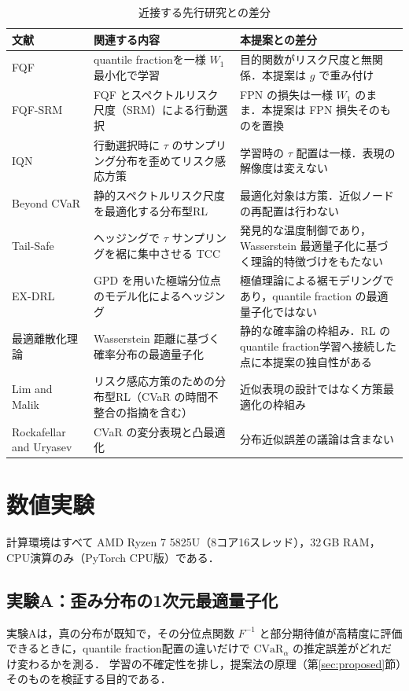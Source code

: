 \documentclass[a4paper,10pt]{jsarticle}
\theoremstyle{definition}
\newcommand{\CVaR}{\mathrm{CVaR}}
\newcommand{\Wone}{W_1}
\newcommand{\Finv}{F^{-1}}
\begin{document}
\begin{table}[htbp]
\centering
\caption{近接する先行研究との差分}
\label{tab:novelty}
\small
\setlength{\tabcolsep}{3pt}
\begin{tabular}{p{3.8cm}p{5.0cm}p{5.6cm}}
\toprule
文献 & 関連する内容 & 本提案との差分\\
\midrule
FQF \cite{yang2019fqf} & quantile fractionを一様 $\Wone$ 最小化で学習 & 目的関数がリスク尺度と無関係．本提案は $g$ で重み付け\\
FQF-SRM \cite{gan2026energy} & FQF とスペクトルリスク尺度（SRM）による行動選択 & FPN の損失は一様 $W_1$ のまま．本提案は FPN 損失そのものを置換\\
IQN \cite{dabney2018iqn} & 行動選択時に $\tau$ のサンプリング分布を歪めてリスク感応方策 & 学習時の $\tau$ 配置は一様．表現の解像度は変えない\\
Beyond CVaR \cite{moghimi2025beyond} & 静的スペクトルリスク尺度を最適化する分布型RL & 最適化対象は方策．近似ノードの再配置は行わない\\
Tail-Safe \cite{zhang2025tailsafe} & ヘッジングで $\tau$ サンプリングを裾に集中させる TCC & 発見的な温度制御であり，Wasserstein 最適量子化に基づく理論的特徴づけをもたない\\
EX-DRL \cite{malekzadeh2024exdrl} & GPD を用いた極端分位点のモデル化によるヘッジング & 極値理論による裾モデリングであり，quantile fraction の最適量子化ではない\\
最適離散化理論 \cite{graf2000quantization,pflug2014multistage} & Wasserstein 距離に基づく確率分布の最適量子化 & 静的な確率論の枠組み．RL のquantile fraction学習へ接続した点に本提案の独自性がある\\
Lim and Malik \cite{lim2022distributional} & リスク感応方策のための分布型RL（CVaR の時間不整合の指摘を含む） & 近似表現の設計ではなく方策最適化の枠組み\\
Rockafellar and Uryasev \cite{rockafellar2000cvar} & CVaR の変分表現と凸最適化 & 分布近似誤差の議論は含まない\\
\bottomrule
\end{tabular}
\end{table}
\section{数値実験}
\label{sec:exp}
計算環境はすべて AMD Ryzen 7 5825U（8コア16スレッド），32\,GB RAM，CPU演算のみ（PyTorch CPU版）である．

\subsection{実験A：歪み分布の1次元最適量子化}
\label{subsec:expA}
実験Aは，真の分布が既知で，その分位点関数 $\Finv$ と部分期待値が高精度に評価できるときに，quantile fraction配置の違いだけで $\CVaR_\alpha$ の推定誤差がどれだけ変わるかを測る．
学習の不確定性を排し，提案法の原理（第\ref{sec:proposed}節）そのものを検証する目的である．
\end{document}
